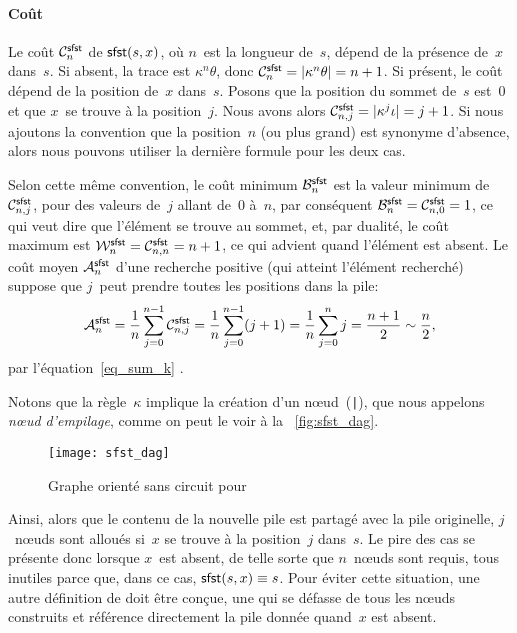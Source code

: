 \paragraph{Coût}

Le coût \(\C{\fun{sfst}}{n}\) de
\(\fun{sfst}(s,x)\), où \(n\)~est la longueur de~\(s\), dépend de la
présence de~\(x\) dans~\(s\). Si absent, la trace est
\(\kappa^n\theta\), donc \(\C{\fun{sfst}}{n} = \len{\kappa^n\theta} =
n + 1\). Si présent, le coût dépend de la position de~\(x\)
dans~\(s\). Posons que la position du sommet de~\(s\) est~\(0\) et que
\(x\)~se trouve à la position~\(j\). Nous avons alors
\(\C{\fun{sfst}}{n,j} = \len{\kappa^j\iota} = j +
1\). Si nous ajoutons la convention
que la position~\(n\) (ou plus grand) est synonyme d'absence, alors
nous pouvons utiliser la dernière formule pour les deux cas.

Selon cette même convention, le coût minimum
\(\B{\fun{sfst}}{n}\) est la valeur
minimum de \(\C{\fun{sfst}}{n,j}\),
pour des valeurs de~\(j\) allant de~\(0\) à~\(n\), par conséquent
\(\B{\fun{sfst}}{n} = \C{\fun{sfst}}{n,0} = 1\), ce qui veut dire que
l'élément se trouve au sommet, et, par dualité, le coût
maximum
est \(\W{\fun{sfst}}{n} =
\C{\fun{sfst}}{n,n} = n + 1\), ce qui advient quand l'élément est
absent. Le coût moyen
\(\M{\fun{sfst}}{n}\) d'une recherche positive (qui atteint l'élément recherché)
suppose que \(j\)~peut prendre toutes les positions dans la pile:
\begin{equation*}
  \M{\fun{sfst}}{n} = \frac{1}{n}\sum_{j=0}^{n-1}\C{\fun{sfst}}{n,j} =
  \frac{1}{n}\sum_{j=0}^{n-1}(j+1) = \frac{1}{n}\sum_{j=0}^{n}j
  = \frac{n+1}{2} \sim \frac{n}{2},
\end{equation*}
par l'équation~\eqref{eq_sum_k} .

Notons que la règle~\(\kappa\) implique la création d'un
n{\oe}ud~(\texttt{|}), que nous appelons \emph{n{\oe}ud
  d'empilage}, comme on peut le voir à la
\fig~\vref{fig:sfst_dag}.
\begin{figure}
\centering
\texttt{[image: sfst\_dag]}
\caption{Graphe orienté sans circuit pour }
\label{fig:sfst_dag}
\end{figure}
Ainsi, alors que le contenu de la nouvelle pile est partagé avec la
pile originelle, \(j\)~n{\oe}uds sont alloués si~\(x\) se trouve à la
position~\(j\) dans~\(s\). Le pire des cas se présente donc lorsque
\(x\)~est absent, de telle sorte que \(n\)~n{\oe}uds sont requis, tous
inutiles parce que, dans ce cas, \(\fun{sfst}(s,x) \equiv s\). Pour
éviter cette situation, une autre définition de  doit être
conçue, une qui se défasse de tous les n{\oe}uds construits et
référence directement la pile donnée quand~\(x\) est absent.

